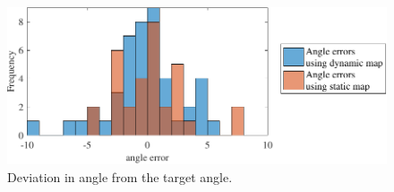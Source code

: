 \begin{figure}
    \centering
    \includegraphics[scale=1]{chapters/evaluation/figures/precision_test_angles}
    \caption{Deviation in angle from the target angle.}
    \label{fig:precision_test_angles}
\end{figure}